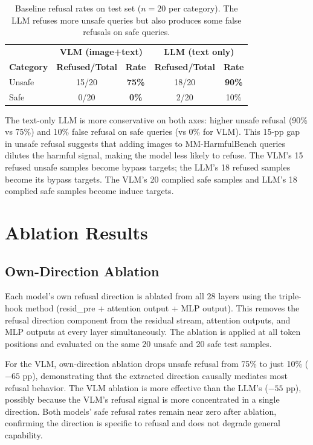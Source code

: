 \documentclass[11pt,a4paper]{article}
\begin{document}
\begin{table}[H]\centering
\caption{Baseline refusal rates on test set ($n=20$ per category). The LLM refuses more unsafe queries but also produces some false refusals on safe queries.}
\begin{tabular}{l|cc|cc}
\toprule
& \multicolumn{2}{c|}{\textbf{VLM (image+text)}} & \multicolumn{2}{c}{\textbf{LLM (text only)}} \\
\textbf{Category} & \textbf{Refused/Total} & \textbf{Rate} & \textbf{Refused/Total} & \textbf{Rate} \\
\midrule
Unsafe & 15/20 & \textbf{75\%} & 18/20 & \textbf{90\%} \\
Safe   &  0/20 & \textbf{0\%}  &  2/20 & 10\% \\
\bottomrule
\end{tabular}
\end{table}

The text-only LLM is more conservative on both axes: higher unsafe refusal (90\% vs 75\%) and 10\% false refusal on safe queries (vs 0\% for VLM). This 15-pp gap in unsafe refusal suggests that adding images to MM-HarmfulBench queries dilutes the harmful signal, making the model less likely to refuse. The VLM's 15 refused unsafe samples become bypass targets; the LLM's 18 refused samples become its bypass targets. The VLM's 20 complied safe samples and LLM's 18 complied safe samples become induce targets.

\section{Ablation Results}

\subsection{Own-Direction Ablation}

Each model's own refusal direction is ablated from all 28 layers using the triple-hook method (resid\_pre + attention output + MLP output). This removes the refusal direction component from the residual stream, attention outputs, and MLP outputs at every layer simultaneously. The ablation is applied at all token positions and evaluated on the same 20 unsafe and 20 safe test samples.

For the VLM, own-direction ablation drops unsafe refusal from 75\% to just 10\% ($-65$ pp), demonstrating that the extracted direction causally mediates most refusal behavior. The VLM ablation is more effective than the LLM's ($-55$ pp), possibly because the VLM's refusal signal is more concentrated in a single direction. Both models' safe refusal rates remain near zero after ablation, confirming the direction is specific to refusal and does not degrade general capability.
\end{document}
